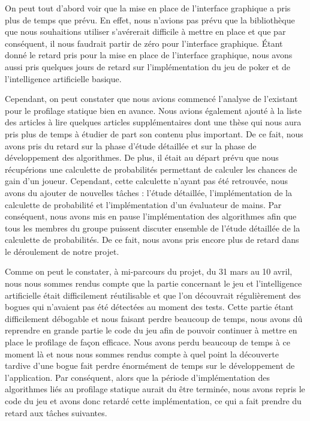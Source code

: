 \documentclass{report}
\begin{document}
On peut tout d'abord voir que la mise en place de l'interface graphique a pris plus de temps que prévu. En effet, nous n'avions pas prévu que la bibliothèque que nous souhaitions utiliser s’avérerait difficile à mettre en place et que par conséquent, il nous faudrait partir de zéro pour l'interface graphique. Étant donné le retard pris pour la mise en place de l'interface graphique, nous avons aussi pris quelques jours de retard sur l'implémentation du jeu de poker et de l'intelligence artificielle basique. \par
Cependant, on peut constater que nous avions commencé l'analyse de l'existant pour le profilage statique bien en avance. Nous avions également ajouté à la liste des articles à lire quelques articles supplémentaires dont une thèse qui nous aura pris plus de temps à étudier de part son contenu plus important. De ce fait, nous avons pris du retard sur la phase d'étude détaillée et sur la phase de développement des algorithmes. De plus, il était au départ prévu que nous récupérions une calculette de probabilités permettant de calculer les chances de gain d'un joueur. Cependant, cette calculette n'ayant pas été retrouvée, nous avons du ajouter de nouvelles tâches : l'étude détaillée, l'implémentation de la calculette de probabilité et l'implémentation d'un évaluateur de mains. Par conséquent, nous avons mis en pause l'implémentation des algorithmes afin que tous les membres du groupe puissent discuter ensemble de l'étude détaillée de la calculette de probabilités. De ce fait, nous avons pris encore plus de retard dans le déroulement de notre projet. \par

Comme on peut le constater, à mi-parcours du projet, du 31 mars au 10 avril, nous nous sommes rendus compte que la partie concernant le jeu et l'intelligence artificielle était difficilement réutilisable et que l'on découvrait régulièrement des bogues qui n'avaient pas été détectées au moment des tests. Cette partie étant difficilement débogable et nous faisant perdre beaucoup de temps, nous avons dû reprendre en grande partie le code du jeu afin de pouvoir continuer à mettre en place le profilage de façon efficace. Nous avons perdu beaucoup de temps à ce moment là et nous nous sommes rendus compte à quel point la découverte tardive d'une bogue fait perdre énormément de temps sur le développement de l'application. Par conséquent, alors que la période d'implémentation des algorithmes liés au profilage statique aurait du être terminée, nous avons repris le code du jeu et avons donc retardé cette implémentation, ce qui a fait prendre du retard aux tâches suivantes.\par
\end{document}
